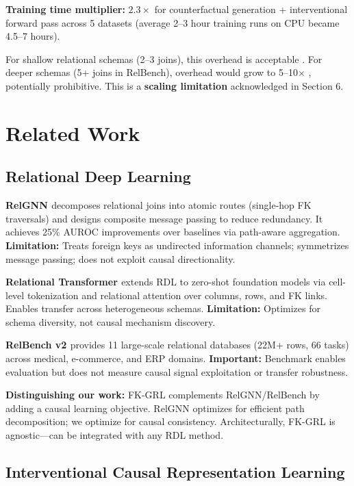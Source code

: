 \documentclass[11pt,letterpaper]{article}
\begin{document}
\textbf{Training time multiplier:} $2.3\times$ for counterfactual generation + interventional forward pass across 5 datasets (average 2--3 hour training runs on CPU became 4.5--7 hours).

For shallow relational schemas (2--3 joins), this overhead is acceptable \cite{Li2023}. For deeper schemas (5+ joins in RelBench), overhead would grow to 5--10$\times$ \cite{Li2023}, potentially prohibitive. This is a \textbf{scaling limitation} acknowledged in Section 6.

\section{Related Work}

\subsection{Relational Deep Learning}

\textbf{RelGNN \cite{Chen2025}} decomposes relational joins into atomic routes (single-hop FK traversals) and designs composite message passing to reduce redundancy. It achieves 25\% AUROC improvements over baselines via path-aware aggregation. \textbf{Limitation:} Treats foreign keys as undirected information channels; symmetrizes message passing; does not exploit causal directionality.

\textbf{Relational Transformer \cite{Ranjan2025}} extends RDL to zero-shot foundation models via cell-level tokenization and relational attention over columns, rows, and FK links. Enables transfer across heterogeneous schemas. \textbf{Limitation:} Optimizes for schema diversity, not causal mechanism discovery.

\textbf{RelBench v2 \cite{Gu2026}} provides 11 large-scale relational databases (22M+ rows, 66 tasks) across medical, e-commerce, and ERP domains. \textbf{Important:} Benchmark enables evaluation but does not measure causal signal exploitation or transfer robustness.

\textbf{Distinguishing our work:} FK-GRL complements RelGNN/RelBench by adding a causal learning objective. RelGNN optimizes for efficient path decomposition; we optimize for causal consistency. Architecturally, FK-GRL is agnostic---can be integrated with any RDL method.

\subsection{Interventional Causal Representation Learning}
\end{document}
